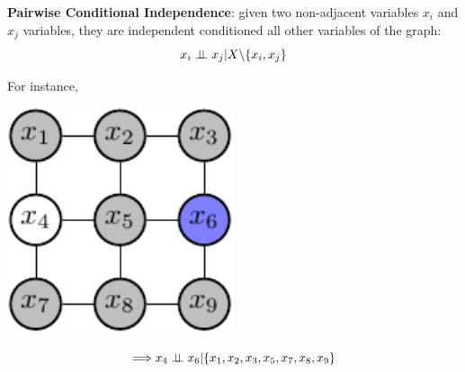 \begin{corollary}
\textbf{Pairwise Conditional Independence}:
  given two non-adjacent variables $x_i$ and $x_j$ variables, they are independent conditioned all other variables of the graph:
 \begin{equation*}
  x_i \perp\!\!\!\perp x_j | X \backslash \{x_i,x_j\}
 \end{equation*}
\end{corollary}
For instance,  \newline\newline 
\begin{minipage}[c]{0.5\textwidth}   
	\centering
	\includegraphics[width=0.5\textwidth]{./Figures/markov_net_2.pdf}
\end{minipage}
\begin{minipage}[c]{0.4\textwidth}
   \begin{equation*}
  \Longrightarrow  x_4 \perp\!\!\!\perp x_6 |\{x_1,x_2,x_3,x_5,x_7,x_8,x_9\}
   \end{equation*}
\end{minipage}


